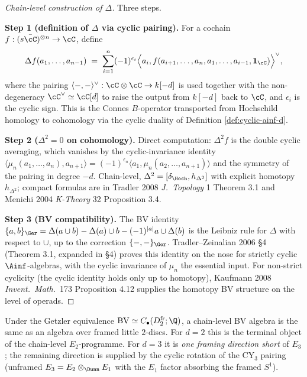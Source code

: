 \begin{proof}[Chain-level construction of $\Delta$]
Three steps.

\textbf{Step 1 (definition of $\Delta$ via cyclic pairing).} For a
cochain $f:(s\bar\cC)^{\otimes n}\to\cC$, define
\[
\Delta f(a_1,\ldots,a_{n-1})\;=\;\sum_{i=1}^{n}(-1)^{\epsilon_i}
\Bigl\langle a_i,f(a_{i+1},\ldots,a_n,a_1,\ldots,a_{i-1},\mathbf 1_\cC)
\Bigr\rangle^\vee,
\]
where the pairing $\langle-,-\rangle^\vee:\cC\otimes\cC\to k[-d]$ is
used together with the non-degeneracy $\cC^\vee\simeq\cC[d]$ to raise
the output from $k[-d]$ back to $\cC$, and $\epsilon_i$ is the cyclic
sign. This is the Connes $B$-operator transported from Hochschild
homology to cohomology via the cyclic duality of Definition
\ref{def:cyclic-ainf-d}.

\textbf{Step 2 ($\Delta^2=0$ on cohomology).} Direct computation:
$\Delta^2 f$ is the double cyclic averaging, which vanishes by the
cyclic-invariance identity
\(
\langle\mu_n(a_1,\ldots,a_n),a_{n+1}\rangle=(-1)^{\epsilon_n}\langle
a_1,\mu_n(a_2,\ldots,a_{n+1})\rangle
\)
and the symmetry of the pairing in degree $-d$. Chain-level,
$\Delta^2 = [\delta_\Hoch,h_{\Delta^2}]$ with explicit homotopy
$h_{\Delta^2}$; compact formulas are in Tradler 2008 \emph{J.\ Topology}
1 Theorem 3.1 and Menichi 2004 \emph{K-Theory} 32 Proposition 3.4.

\textbf{Step 3 (BV compatibility).} The BV identity
$\{a,b\}_\Ger=\Delta(a\cup b)-\Delta(a)\cup b-(-1)^{|a|}a\cup\Delta(b)$
is the Leibniz rule for $\Delta$ with respect to $\cup$, up to the
correction $\{-,-\}_\Ger$. Tradler--Zeinalian 2006 \S 4 (Theorem 3.1,
expanded in \S 4) proves this identity on the nose for strictly
cyclic $\Ainf$-algebras, with the cyclic invariance of $\mu_n$ the
essential input. For non-strict cyclicity (the cyclic identity holds
only up to homotopy), Kaufmann 2008 \emph{Invent.\ Math.}\ 173
Proposition 4.12 supplies the homotopy BV structure on the level of
operads.
\end{proof}

\begin{proposition}
\label{wave-cfg-prop:bv-framed-e2}
Under the Getzler equivalence
$\mathrm{BV}\simeq C_\bullet(D^{\mathrm{fr}}_2;\Q)$, a chain-level BV
algebra is the same as an algebra over framed little $2$-discs. For
$d=2$ this is the terminal object of the chain-level $E_2$-programme.
For $d=3$ it is \emph{one framing direction short} of $E_3$; the
remaining direction is supplied by the cyclic rotation of the CY$_3$
pairing (unframed $E_3 = E_2\otimes_\Dunn E_1$ with the $E_1$ factor
absorbing the framed $S^1$).
\end{proposition}

